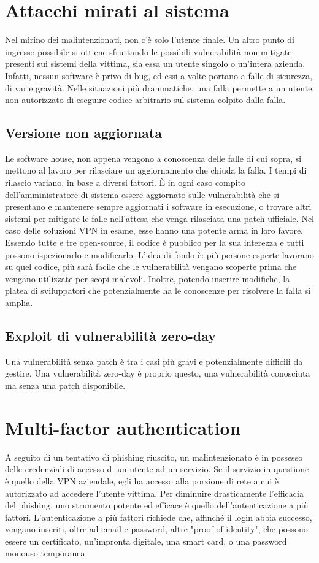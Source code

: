 \section{Attacchi mirati al sistema}
Nel mirino dei malintenzionati, non c'è solo l'utente finale. Un altro punto di ingresso possibile si ottiene sfruttando le possibili vulnerabilità non mitigate presenti sui sistemi della vittima, sia essa un utente singolo o un'intera azienda.
Infatti, nessun software è privo di bug, ed essi a volte portano a falle di sicurezza, di varie gravità. Nelle situazioni più drammatiche, una falla permette a un utente non autorizzato di eseguire codice arbitrario sul sistema colpito dalla falla.

\subsection{Versione non aggiornata}
Le software house, non appena vengono a conoscenza delle falle di cui sopra, si mettono al lavoro per rilasciare un aggiornamento che chiuda la falla.
I tempi di rilascio variano, in base a diversi fattori. È in ogni caso compito dell'amministratore di sistema essere aggiornato sulle vulnerabilità che si presentano e mantenere sempre aggiornati i software in esecuzione, o trovare altri sistemi per mitigare le falle nell'attesa che venga rilasciata una patch ufficiale.
Nel caso delle soluzioni VPN in esame, esse hanno una potente arma in loro favore.
Essendo tutte e tre open-source, il codice è pubblico per la sua interezza e tutti possono ispezionarlo e modificarlo.
L'idea di fondo è: più persone esperte lavorano su quel codice, più sarà facile che le vulnerabilità vengano scoperte prima che vengano utilizzate per scopi malevoli.
Inoltre, potendo inserire modifiche, la platea di sviluppatori che potenzialmente ha le conoscenze per risolvere la falla si amplia.

\subsection{Exploit di vulnerabilità zero-day}
Una vulnerabilità senza patch è tra i casi più gravi e potenzialmente difficili da gestire. Una vulnerabilità zero-day è proprio questo, una vulnerabilità conosciuta ma senza una patch disponibile.

\section{Multi-factor authentication}
A seguito di un tentativo di phishing riuscito, un malintenzionato è in possesso delle credenziali di accesso di un utente ad un servizio. Se il servizio in questione è quello della VPN aziendale, egli ha accesso alla porzione di rete a cui è autorizzato ad accedere l'utente vittima.
Per diminuire drasticamente l'efficacia del phishing, uno strumento potente ed efficace è quello dell'autenticazione a più fattori.
L'autenticazione a più fattori richiede che, affinché il login abbia successo, vengano inseriti, oltre ad email e password, altre "proof of identity", che possono essere un certificato, un'impronta digitale, una smart card, o una password monouso temporanea.

